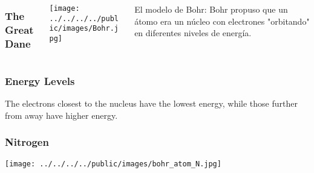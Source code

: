 \documentclass{beamer}
\begin{document}
\begin{frame}
    \begin{columns}
        \frametitle{The Great Dane}
        \begin{column}{0.5\textwidth}
            \texttt{[image: ../../../../public/images/Bohr.jpg]}
        \end{column}
        \begin{column}{0.5\textwidth}
            El modelo de Bohr: Bohr propuso que un átomo era un núcleo con electrones "orbitando" en diferentes 
            \pause \alert{niveles de energía}.
            \vspace{1cm}
        
        \end{column}
    \end{columns}
\end{frame}

\begin{frame}
    
    \frametitle{Energy Levels}
    \onslide The electrons closest to the nucleus have the 
    \pause \alert{lowest} 
    \onslide energy, while those further from away have 
    \pause\alert{higher} 
    \onslide energy.
\end{frame}

\begin{frame}
    \frametitle{Nitrogen}
    \texttt{[image: ../../../../public/images/bohr\_atom\_N.jpg]}
\end{frame}
\end{document}
